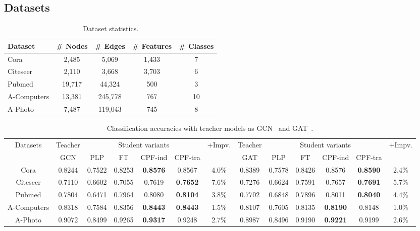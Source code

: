 \documentclass[sigconf]{acmart}
\begin{document}
\subsection{Datasets}
\begin{table}[htb]
    \centering
    \caption{Dataset statistics.}
    \resizebox{0.98\columnwidth}{!}
	{
    \begin{tabular}{l|cccc}
    \hline
        Dataset & \# Nodes & \# Edges & \# Features & \# Classes \\
    \hline
       Cora & 2,485 & 5,069 & 1,433 & 7 \\
       Citeseer & 2,110 & 3,668 & 3,703 & 6\\
       Pubmed & 19,717 & 44,324 & 500 & 3\\
       A-Computers & 13,381 & 245,778 & 767 & 10\\
       A-Photo & 7,487 & 119,043 & 745 & 8\\
     \hline
    \end{tabular}}
    \label{tab:data}
\end{table}

\begin{table*}[ht]
\centering
\caption{Classification accuracies with teacher models as GCN~\cite{kipf2016semi} and GAT~\cite{velivckovic2018graph}.}
\label{tab:acc1}
\begin{tabular}{|c|c|c|c|c|c|c||c|c|c|c|c|c|}
\hline
\multirow{2}{*}{Datasets} & Teacher & \multicolumn{4}{c|}{Student variants}               & \multirow{2}{*}{+Impv.} & Teacher & \multicolumn{4}{c|}{Student variants}               & \multirow{2}{*}{+Impv.} \\ \cline{2-6} \cline{8-12}
                          & GCN     & PLP    & FT     & CPF-ind         & CPF-tra         &                         & GAT     & PLP    & FT     & CPF-ind         & CPF-tra         &                         \\ \hline
Cora                      & 0.8244  & 0.7522 & 0.8253 & \textbf{0.8576} & 0.8567          & 4.0\%                   & 0.8389  & 0.7578 & 0.8426 & 0.8576          & \textbf{0.8590} & 2.4\%                   \\ \hline
Citeseer                  & 0.7110  & 0.6602 & 0.7055 & 0.7619          & \textbf{0.7652} & 7.6\%                   & 0.7276  & 0.6624 & 0.7591 & 0.7657          & \textbf{0.7691} & 5.7\%                   \\ \hline
Pubmed                    & 0.7804  & 0.6471 & 0.7964 & 0.8080          & \textbf{0.8104} & 3.8\%                   & 0.7702  & 0.6848 & 0.7896 & 0.8011          & \textbf{0.8040} & 4.4\%                   \\ \hline
A-Computers               & 0.8318  & 0.7584 & 0.8356 & \textbf{0.8443} & \textbf{0.8443} & 1.5\%                   & 0.8107  & 0.7605 & 0.8135 & \textbf{0.8190} & 0.8148          & 1.0\%                   \\ \hline
A-Photo                   & 0.9072  & 0.8499 & 0.9265 & \textbf{0.9317} & 0.9248          & 2.7\%                   & 0.8987  & 0.8496 & 0.9190 & \textbf{0.9221} & 0.9199          & 2.6\%                   \\ \hline
\end{tabular}
\end{table*}
\end{document}
